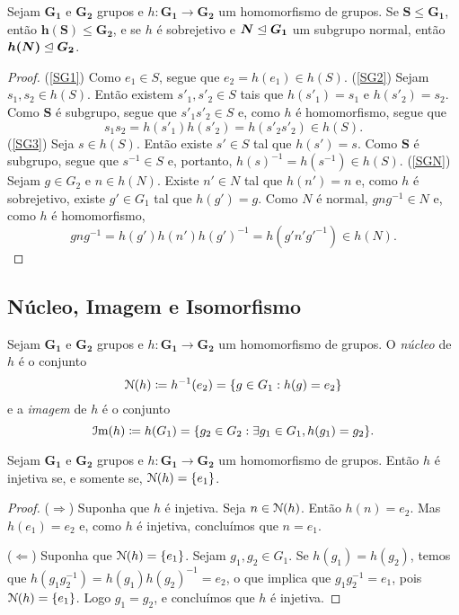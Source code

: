 \begin{prop}
\label{alge:prop.gru.hom}
Sejam $\bm{G_1}$ e $\bm{G_2}$ grupos e $h: \bm{G_1} \to \bm{G_2}$ um homomorfismo de grupos. Se $\bm S \leq \bm{G_1}$, então $\bm{h(S)} \leq \bm{G_2}$, e se $h$ é sobrejetivo e $\bm N \mathrel{\unlhd} \bm{G_1}$ um subgrupo normal, então $\bm{h(N)} \mathrel{\unlhd} \bm{G_2}$.
\end{prop}
\begin{proof}
(\ref{SG1}) Como $e_1 \in S$, segue que $e_2=h(e_1) \in h(S)$.
(\ref{SG2}) Sejam $s_1,s_2 \in h(S)$. Então existem $s'_1,s'_2 \in S$ tais que $h(s'_1)=s_1$ e $h(s'_2)=s_2$. Como $\bm S$ é subgrupo, segue que $s'_1s'_2 \in S$ e, como $h$ é homomorfismo, segue que
	\begin{equation*}
	s_1s_2 = h(s'_1)h(s'_2) = h(s'_2s'_2) \in h(S).
	\end{equation*}
(\ref{SG3}) Seja $s \in h(S)$. Então existe $s' \in S$ tal que $h(s')=s$. Como $\bm S$ é subgrupo, segue que $s^{-1} \in S$ e, portanto, $h(s)^{-1} = h(s^{-1}) \in h(S)$. (\ref{SGN}) Sejam $g \in G_2$ e $n \in h(N)$. Existe $n' \in N$ tal que $h(n')=n$ e, como $h$ é sobrejetivo, existe $g' \in G_1$ tal que $h(g')=g$. Como $N$ é normal, $gng^{-1} \in N$ e, como $h$ é homomorfismo,
	\begin{equation*}
	gng^{-1} = h(g')h(n')h(g')^{-1} = h(g'n'g'^{-1}) \in h(N).
	\end{equation*}
\end{proof}

\subsection{Núcleo, Imagem e Isomorfismo}

\begin{defi}
Sejam $\bm{G_1}$ e $\bm{G_2}$ grupos e $h: \bm{G_1} \to \bm{G_2}$ um homomorfismo de grupos. O \emph{núcleo} de $h$ é o conjunto
	\begin{equation*}
	\nuc(h) \coloneqq h^{-1}(e_2) = \{g \in G_1 : h(g) = e_2\}
	\end{equation*}
e a \emph{imagem} de $h$ é o conjunto
	\begin{equation*}
	\im(h) \coloneqq h(G_1) = \{g_2 \in G_2 : \exists g_1 \in G_1, h(g_1) = g_2\}.
	\end{equation*}
\end{defi}

\begin{prop}
\label{pro:gru.nuc.inj}
Sejam $\bm{G_1}$ e $\bm{G_2}$ grupos e $h: \bm{G_1} \to \bm{G_2}$ um homomorfismo de grupos. Então $h$ é injetiva se, e somente se, $\mathcal{N}(h)=\{e_1\}$.
\end{prop}
\begin{proof}
($\Rightarrow$)	Suponha que $h$ é injetiva. Seja $n \in \mathcal{N}(h)$. Então $h(n)=e_2$. Mas $h(e_1)=e_2$ e, como $h$ é injetiva, concluímos que $n=e_1$.

\noindent
($\Leftarrow$) Suponha que $\mathcal{N}(h)=\{e_1\}$. Sejam $g_1,g_2 \in G_1$. Se $h(g_1)=h(g_2)$, temos que $h(g_1 g_2^{-1}) = h(g_1) h(g_2)^{-1} = e_2$, o que implica que $g_1 g_2^{-1} = e_1$, pois $\mathcal{N}(h)=\{e_1\}$. Logo $g_1=g_2$, e concluímos que $h$ é injetiva.
\end{proof}

